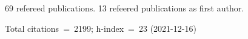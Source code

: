 69 refereed publications. 13 refeered publications as first author.

Total citations~=~2199; h-index~=~23 (2021-12-16)